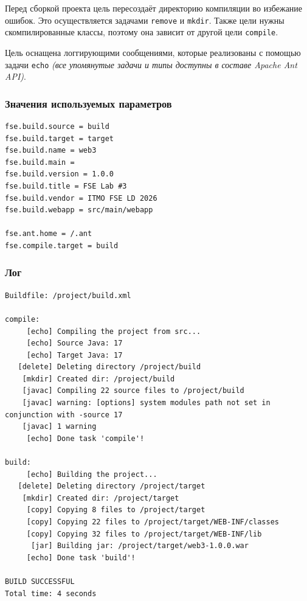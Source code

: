 Перед сборкой проекта цель пересоздаёт директорию компиляции во избежание ошибок. Это осуществляется задачами \texttt{remove} и \texttt{mkdir}. Также цели нужны скомпилированные классы, поэтому она зависит от другой цели \texttt{compile}.

Цель оснащена логгирующими сообщениями, которые реализованы с помощью задачи \texttt{echo} \textit{(все упомянутые задачи и типы доступны в составе Apache Ant API)}.

\subsubsection{Значения используемых параметров}

\begin{lstlisting}[language=Properties,caption={Часть содержимого файла \texttt{build.properties}},captionpos=b]
fse.build.source = build
fse.build.target = target
fse.build.name = web3
fse.build.main = 
fse.build.version = 1.0.0
fse.build.title = FSE Lab #3
fse.build.vendor = ITMO FSE LD 2026
fse.build.webapp = src/main/webapp

fse.ant.home = /.ant
fse.compile.target = build
\end{lstlisting}

\subsubsection{Лог}

\begin{lstlisting}[caption={Лог цели \texttt{build}},language={},captionpos=b]
Buildfile: /project/build.xml

compile:
     [echo] Compiling the project from src...
     [echo] Source Java: 17
     [echo] Target Java: 17
   [delete] Deleting directory /project/build
    [mkdir] Created dir: /project/build
    [javac] Compiling 22 source files to /project/build
    [javac] warning: [options] system modules path not set in conjunction with -source 17
    [javac] 1 warning
     [echo] Done task 'compile'!

build:
     [echo] Building the project...
   [delete] Deleting directory /project/target
    [mkdir] Created dir: /project/target
     [copy] Copying 8 files to /project/target
     [copy] Copying 22 files to /project/target/WEB-INF/classes
     [copy] Copying 32 files to /project/target/WEB-INF/lib
      [jar] Building jar: /project/target/web3-1.0.0.war
     [echo] Done task 'build'!

BUILD SUCCESSFUL
Total time: 4 seconds
\end{lstlisting}